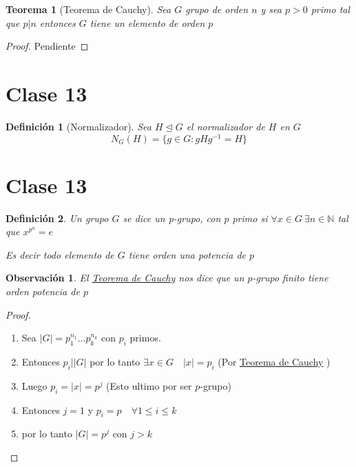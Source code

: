 \documentclass[10pt]{extarticle}
\theoremstyle{break}
\newtheorem{theorem}{Teorema}[section]
\newtheorem*{remark}{Observación}
\newtheorem{definition}{Definición}[section]
\theoremstyle{definition}
\begin{document}
\begin{theorem}[Teorema de Cauchy]\label{12.2}
	Sea $G$ grupo de orden $ n $ y sea $ p>0 $ primo tal que $ p|n $ entonces $G$ tiene un elemento de orden $ p $
\end{theorem}

\begin{proof}
	Pendiente
\end{proof}


\section{Clase 13}

\begin{definition}[Normalizador]
	Sea $H\trianglelefteq G$ el normalizador de $H$ en $G$ 
	$$N_{G}(H)= \{g\in G: gHg^{-1}=H\}$$ 
\end{definition}


\section{Clase 13}

\begin{definition}
	Un grupo $G$ se dice un p-grupo, con $p$ primo si $\forall x\in G \ \exists n\in \mathbb{N} $ tal que $x^{p^{n}}=e$ 
	
	Es decir todo elemento de $G$ tiene orden una potencia de $p$ 
\end{definition}

\begin{remark}
	El \hyperref[12.2]{Teorema de Cauchy} nos dice que un $p$-grupo finito tiene orden potencia de $p$  
\end{remark}
\begin{proof}
	\begin{enumerate}
		\item Sea $\lvert G \rvert =p_{1}^{n_{1}}\ldots p_{k}^{n_{k}}$ con $p_{i}$ primos.
		\item Entonces $p_{i}\big|\lvert G \rvert $ por lo tanto $\exists x\in G\quad \lvert x \rvert = p_{i}$ (Por \hyperref[12.2]{Teorema de Cauchy} )
		\item Luego $p_{i}=\lvert x \rvert =p^j $ (Esto ultimo por ser $p$-grupo) 
		\item Entonces $j=1$ y $p_{i}=p\quad \forall 1\leq i\leq k$ 
		\item por lo tanto $\lvert G \rvert =p^j$ con $j>k$  
	\end{enumerate}  
\end{proof}
\end{document}
